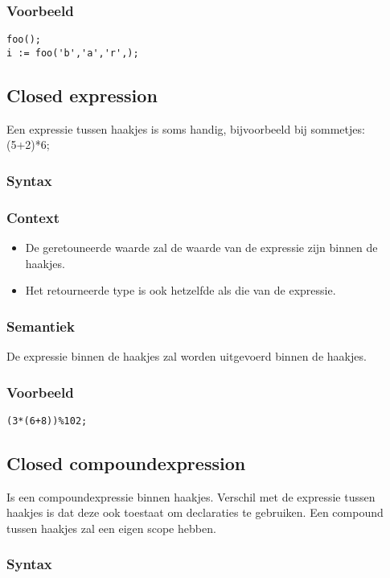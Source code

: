 \documentclass[]{article}
\begin{document}
\subsubsection{Voorbeeld}
\begin{lstlisting}[style=SELMA]
foo();
i := foo('b','a','r',);
\end{lstlisting}


\subsection{Closed expression}
Een expressie tussen haakjes is soms handig, bijvoorbeeld bij sommetjes: (5+2)*6;
\subsubsection{Syntax}

\subsubsection{Context}
\begin{itemize}
\item De geretouneerde waarde zal de waarde van de expressie zijn binnen de haakjes.
\item Het retourneerde type is ook hetzelfde als die van de expressie.
\end{itemize}
\subsubsection{Semantiek}
De expressie binnen de haakjes zal worden uitgevoerd binnen de haakjes.
\subsubsection{Voorbeeld}
\begin{lstlisting}[style=SELMA]
(3*(6+8))%102;
\end{lstlisting}

\subsection{Closed compoundexpression}
Is een compoundexpressie binnen haakjes. Verschil met de expressie tussen haakjes is dat deze ook toestaat om declaraties te gebruiken. Een compound tussen haakjes zal een eigen scope hebben.
\subsubsection{Syntax}

\end{document}
